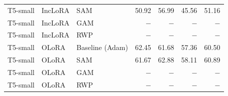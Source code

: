 \begin{table}[ht]
\begin{tabular}{@{}l l l r r r r@{}}
T5-small & IncLoRA & SAM & 50.92 & 56.99 & 45.56 & 51.16 \\
T5-small & IncLoRA & GAM & $-$ & $-$ & $-$ & $-$ \\
T5-small & IncLoRA & RWP & $-$ & $-$ & $-$ & $-$ \\
\addlinespace[2pt]
T5-small & OLoRA & Baseline (Adam) & 62.45 & 61.68 & 57.36 & 60.50 \\
T5-small & OLoRA & SAM & 61.67 & 62.88 & 58.11 & 60.89 \\
T5-small & OLoRA & GAM & $-$ & $-$ & $-$ & $-$ \\
T5-small & OLoRA & RWP & $-$ & $-$ & $-$ & $-$ \\
\bottomrule
\end{tabular}
\end{table}
